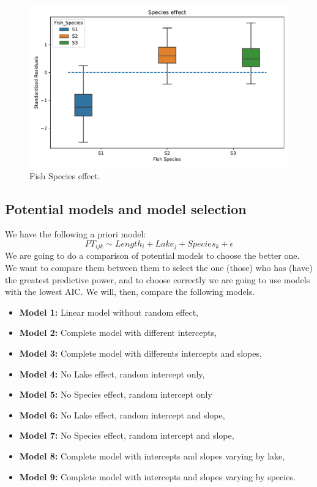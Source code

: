 \documentclass{article}
\begin{document}
\begin{figure}[h!]
    \centering
    \includegraphics[scale = 0.7]{images/boxplot_species_effect.pdf}
    \caption{Fish Species effect.}
    \label{boxplot_species}
\end{figure}

\subsection{Potential models and model selection}
We have the following a priori model:
\begin{equation*}
    PT_{ijk} \sim Length_i + Lake_j + Species_k + \epsilon
\end{equation*}
We are going to do a comparison of potential models to choose the better one. We want to compare them between them to select the one (those) who has (have) the greatest predictive power, and to choose correctly we are going to use models with the lowest AIC. We will, then, compare the following models.

\begin{itemize}
    \item \textbf{Model 1:} Linear model without random effect,
    \item \textbf{Model 2:} Complete model with different intercepts, 
    \item \textbf{Model 3:} Complete model with differents intercepts and slopes,
    \item \textbf{Model 4:} No Lake effect, random intercept only,
    \item \textbf{Model 5:} No Species effect, random intercept only
    \item \textbf{Model 6:} No Lake effect, random intercept and slope,
    \item \textbf{Model 7:} No Species effect, random intercept and slope,
    \item \textbf{Model 8:} Complete model with intercepts and slopes varying by lake, 
    \item \textbf{Model 9:} Complete model with intercepts and slopes varying by species.
\end{itemize}
\end{document}

